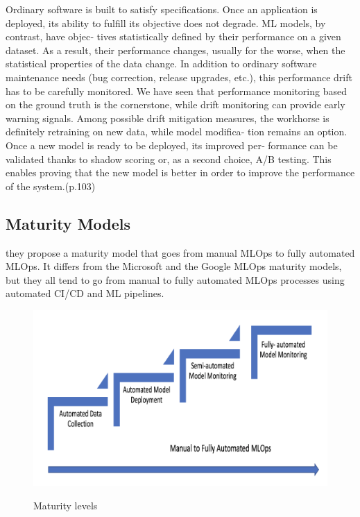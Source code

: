 Ordinary software is built to satisfy specifications. Once an application is deployed,
its ability to fulfill its objective does not degrade. ML models, by contrast, have objec‐
tives statistically defined by their performance on a given dataset. As a result, their
performance changes, usually for the worse, when the statistical properties of the data
change.
In addition to ordinary software maintenance needs (bug correction, release
upgrades, etc.), this performance drift has to be carefully monitored. We have seen
that performance monitoring based on the ground truth is the cornerstone, while
drift monitoring can provide early warning signals. Among possible drift mitigation
measures, the workhorse is definitely retraining on new data, while model modifica‐
tion remains an option. Once a new model is ready to be deployed, its improved per‐
formance can be validated thanks to shadow scoring or, as a second choice, A/B
testing. This enables proving that the new model is better in order to improve the
performance of the system.\cite{treveil2020introducing}(p.103)


\subsection{Maturity Models}\label{subsec:maturity-models}
\cite{mlops-maturity-model} they propose a maturity model that goes from manual MLOps to fully automated MLOps.
It differs from the Microsoft and the Google MLOps maturity models,
but they all tend to go from manual to fully automated MLOps processes using automated CI/CD and
ML pipelines.\cite{mlops-definition-tools-and-challenge}

\begin{figure}[!htbp]
    \caption{Maturity levels \cite{mlops-maturity-model}}
    \centering
    \includegraphics[scale=0.5]{images/maturity-levels}
    \label{fig:maturity}
\end{figure}

